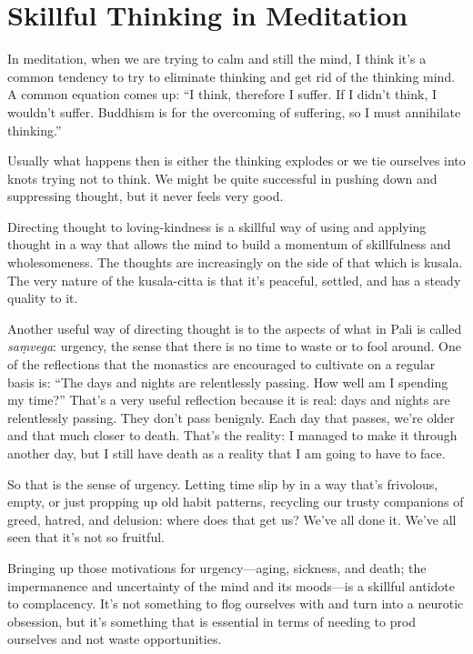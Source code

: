 \chapter{Skillful Thinking in
Meditation}

In meditation, when we are trying to calm and still the mind, I think
it’s a common tendency to try to eliminate thinking and get rid of the
thinking mind. A common equation comes up: “I think, therefore I suffer.
If I didn’t think, I wouldn’t suffer. Buddhism is for the overcoming of
suffering, so I must annihilate thinking.”

Usually what happens then is either the thinking explodes or we tie
ourselves into knots trying not to think. We might be quite successful
in pushing down and suppressing thought, but it never feels very good.

Directing thought to loving-kindness is a skillful way of using and
applying thought in a way that allows the mind to build a momentum of
skillfulness and wholesomeness. The thoughts are increasingly on the
side of that which is kusala. The very nature of the kusala-citta is
that it’s peaceful, settled, and has a steady quality to it.

Another useful way of directing thought is to the aspects of what in
Pali is called \emph{saṃvega}: urgency, the sense that there is no time
to waste or to fool around. One of the reflections that the monastics
are encouraged to cultivate on a regular basis is: “The days and nights
are relentlessly passing. How well am I spending my time?” That’s a very
useful reflection because it is real: days and nights are relentlessly
passing. They don’t pass benignly. Each day that passes, we’re older and
that much closer to death. That’s the reality: I managed to make it
through another day, but I still have death as a reality that I am going
to have to face.

So that is the sense of urgency. Letting time slip by in a way that’s
frivolous, empty, or just propping up old habit patterns, recycling our
trusty companions of greed, hatred, and delusion: where does that get
us? We’ve all done it. We’ve all seen that it’s not so fruitful.

Bringing up those motivations for urgency—aging, sickness, and death;
the impermanence and uncertainty of the mind and its moods—is a skillful
antidote to complacency. It’s not something to flog ourselves with and
turn into a neurotic obsession, but it’s something that is essential in
terms of needing to prod ourselves and not waste opportunities.

